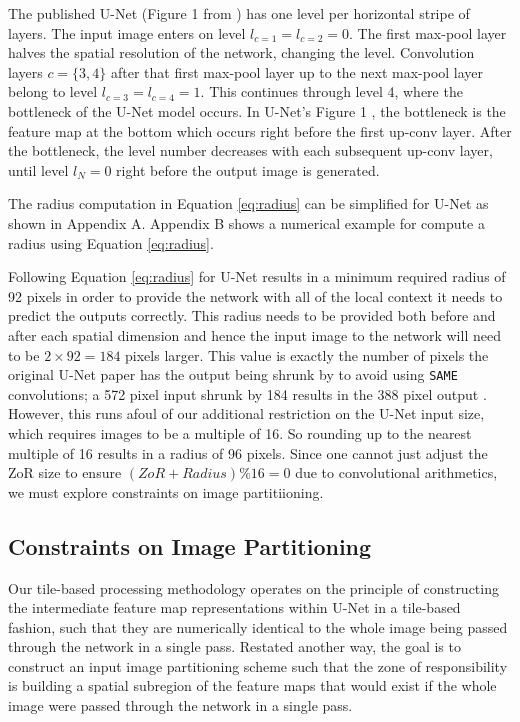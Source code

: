 \documentclass[runningheads]{llncs}
\begin{document}
The published U-Net (Figure 1 from \cite{Ronneberger2015a}) has one level per horizontal stripe of layers. The input image enters on level $l_{c=1} = l_{c=2} = 0$. The first max-pool layer halves the spatial resolution of the network, changing the level. Convolution layers $c = \{3, 4\}$ after that first max-pool layer up to the next max-pool layer belong to level $l_{c=3}=l_{c=4} = 1$. This continues through level 4, where the bottleneck of the U-Net model occurs. In U-Net's Figure 1 \cite{Ronneberger2015a}, the bottleneck is the feature map at the bottom which occurs right before the first up-conv layer. After the bottleneck, the level number decreases with each subsequent up-conv layer, until level $l_{N} = 0$ right before the output image is generated. 

The radius computation in Equation \ref{eq:radius} can be simplified for U-Net as shown in Appendix A. Appendix B shows a numerical example for compute a radius using Equation \ref{eq:radius}.

Following Equation \ref{eq:radius} 
for U-Net results in a minimum required radius of 92 pixels in order to provide the network with all of the local context it needs to predict the outputs correctly. This radius needs to be provided both before and after each spatial dimension and hence the input image to the network will need to be $2 \times 92 = 184$ pixels larger. This value is exactly the number of pixels the original U-Net paper has the output being shrunk by to avoid using \texttt{SAME} convolutions; a 572 pixel input shrunk by 184 results in the 388 pixel output \cite{Ronneberger2015a}. 
However, this runs afoul of our additional restriction on the U-Net input size, which requires images to be a multiple of 16. So rounding up to the nearest multiple of 16 results in a radius of 96 pixels. Since  one cannot just adjust the ZoR size to ensure $(ZoR + Radius) \% 16 = 0$ due to convolutional arithmetics, we must explore constraints on image partitiioning. 

\subsection{Constraints on Image Partitioning}

Our tile-based processing methodology operates on the principle of constructing the intermediate feature map representations within U-Net in a tile-based fashion, such that they are numerically identical to the whole image being passed through the network in a single pass. Restated another way, the goal is to construct an input image partitioning scheme such that the zone of responsibility is building a spatial subregion of the feature maps that would exist if the whole image were passed through the network in a single pass. 
\end{document}
